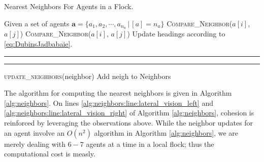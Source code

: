 \begin{algorithm}[tb!]
\caption{Nearest Neighbors For Agents in a Flock.
		\label{alg:neighbors}}
\begin{algorithmic}[1]
	\State Given a set of agents $\bm{a} = \{a_1, a_2, \cdots, a_{n_a} \,| \,[a] = n_a\}$ 
		\label{alg:neighbors:line:lateral_vision_left}
			\State \textsc{Compare\_Neighbor($a[i]$, $a[j]$)}
		\EndFor
		\label{alg:neighbors:line:lateral_vision_right}
		\State \textsc{Compare\_Neighbor($a[i]$, $a[j]$)}
		\EndFor
	\EndFor
	 \State Update headings according to \eqref{eq:DubinsJadbabaie}.
	\EndFor 
\EndFunction
\end{algorithmic}
%
\hrule
%
\begin{algorithmic}[1]
	\EndIf
	\EndFunction
\end{algorithmic}
%
\hrule
%
\begin{algorithmic}[1]
	\State {}
			\State \textsc{\textsf{update\_neighbors}}(\textup{neighbor})
		\EndFor 
	\EndIf
	\State Add \textup{\textsf{neigh}} to \textsf{Neighbors}
	\EndFunction
	\EndProcedure
\end{algorithmic}
\end{algorithm}
%

The algorithm for computing the nearest neighbors is given in Algorithm \autoref{alg:neighbors}. On lines \autoref{alg:neighbors:line:lateral_vision_left} and \autoref{alg:neighbors:line:lateral_vision_right} of Algorithm \autoref{alg:neighbors}, cohesion is reinforced by leveraging the observations above. While the neighbor updates for an agent involve an $O(n^2)$ algorithm in Algorithm \ref{alg:neighbors}, we are merely dealing with $6-7$ agents at a time in a local flock; thus the computational cost is measly.

